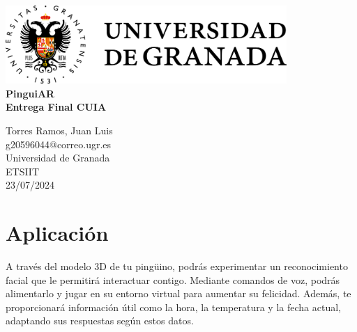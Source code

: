 \documentclass{article}
\begin{document}
\begin{center}
  \vspace*{0.5\baselineskip} %
  \includegraphics[width=0.8\textwidth]{ugr-2.png}\\
  \vfill
  {\Huge \textbf{PinguiAR}}\\ %
  \vspace*{2\baselineskip}
  {\LARGE \textbf{Entrega Final CUIA}}\\
  \begin{large}
    \vspace*{1\baselineskip}
    {\Large Torres Ramos, Juan Luis \\}
    \vspace*{0.5\baselineskip}
    {g20596044@correo.ugr.es}\\[1cm]
    \vfill
    {Universidad de Granada}\\
    {\large ETSIIT}\\
    {\large 23/07/2024}\par
    \vspace*{3\baselineskip}
  \end{large}
  \thispagestyle{empty} 
\end{center}
\pagebreak

\tableofcontents
\thispagestyle{nofooter}
\cleardoublepage

\section{Aplicación} %
\label{Propuesta}
A través del modelo 3D de tu pingüino, podrás experimentar un reconocimiento facial que le permitirá interactuar contigo. Mediante comandos de voz, podrás alimentarlo y jugar en su entorno virtual para aumentar su felicidad. Además, te proporcionará información útil como la hora, la temperatura y la fecha actual, adaptando sus respuestas según estos datos.

\end{document}
